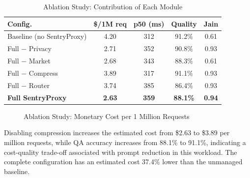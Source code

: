 \documentclass[conference]{IEEEtran}
\begin{document}
\begin{table}[htbp]
\caption{Ablation Study: Contribution of Each Module}
\begin{center}
\begin{tabular}{|l|c|c|c|c|}
\hline
\textbf{Config.} & \textbf{\$/1M req} & \textbf{p50 (ms)} & \textbf{Quality} & \textbf{Jain} \\
\hline
Baseline (no SentryProxy) & 4.20 & 312 & 91.2\% & 0.61 \\
Full $-$ Privacy          & 2.71 & 352 & 90.8\% & 0.93 \\
Full $-$ Market           & 2.68 & 343 & 88.3\% & 0.61 \\
Full $-$ Compress         & 3.89 & 317 & 91.1\% & 0.93 \\
Full $-$ Router           & 3.74 & 385 & 86.4\% & 0.93 \\
\textbf{Full SentryProxy} & \textbf{2.63} & \textbf{359} & \textbf{88.1\%} & \textbf{0.94} \\
\hline
\end{tabular}
\label{tab:ablation}
\end{center}
\end{table}

\begin{figure}[htbp]
\centering
{}
\caption{Ablation Study: Monetary Cost per 1 Million Requests}
\label{fig:ablation_cost}
\end{figure}

Disabling compression increases the estimated cost from \$2.63 to \$3.89 per million requests, while QA accuracy increases from 88.1\% to 91.1\%, indicating a cost-quality trade-off associated with prompt reduction in this workload. The complete configuration has an estimated cost 37.4\% lower than the unmanaged baseline.

\end{document}

